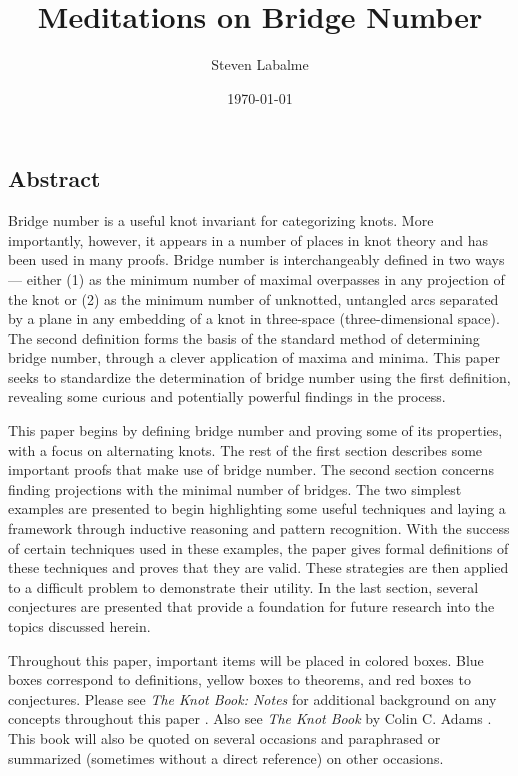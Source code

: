 \documentclass[titlepage,11pt]{article}
\title{Meditations on Bridge Number}
\author{Steven Labalme}
\date{\today}
\begin{document}
\maketitle



\tableofcontents
\listoffigures
\listoftables
\newpage



\pagestyle{fancy}
\fancyhf{}
\renewcommand{\headrulewidth}{0pt}
\setcounter{secnumdepth}{0}
\begin{center}
    \section{Abstract}
\end{center}
Bridge number is a useful knot invariant for categorizing knots. More importantly, however, it appears in a number of places in knot theory and has been used in many proofs. Bridge number is interchangeably defined in two ways --- either (1) as the minimum number of maximal overpasses in any projection of the knot or (2) as the minimum number of unknotted, untangled arcs separated by a plane in any embedding of a knot in three-space (three-dimensional space). The second definition forms the basis of the standard method of determining bridge number, through a clever application of maxima and minima. This paper seeks to standardize the determination of bridge number using the first definition, revealing some curious and potentially powerful findings in the process.\par
This paper begins by defining bridge number and proving some of its properties, with a focus on alternating knots. The rest of the first section describes some important proofs that make use of bridge number. The second section concerns finding projections with the minimal number of bridges. The two simplest examples are presented to begin highlighting some useful techniques and laying a framework through inductive reasoning and pattern recognition. With the success of certain techniques used in these examples, the paper gives formal definitions of these techniques and proves that they are valid. These strategies are then applied to a difficult problem to demonstrate their utility. In the last section, several conjectures are presented that provide a foundation for future research into the topics discussed herein.\par
Throughout this paper, important items will be placed in colored boxes. Blue boxes correspond to definitions, yellow boxes to theorems, and red boxes to conjectures. Please see \emph{The Knot Book: Notes} for additional background on any concepts throughout this paper \cite{bib:knotnotes}. Also see \emph{The Knot Book} by Colin C. Adams \cite{bib:knotbook}. This book will also be quoted on several occasions and paraphrased or summarized (sometimes without a direct reference) on other occasions.
\newpage
\end{document}
